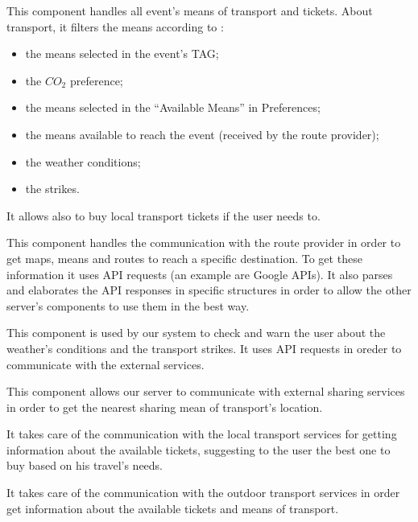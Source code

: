 This component handles all event’s means of transport and tickets. About transport, it filters the means according to :
\begin{itemize}
	\setlength{\leftskip}{1cm}
	\item the means selected in the event’s TAG;
	\item the $CO_2$ preference;
	\item the means selected in the “Available Means” in Preferences;
	\item the means available to reach the event (received by the route provider);
	\item the weather conditions;
	\item the strikes.
\end{itemize}
It allows also to buy local transport tickets if the user needs to. 

This component handles the communication with the route provider in order to get maps, means and routes to reach a specific destination. To get these information it uses API requests (an example are Google APIs).
It also parses and elaborates the API responses in specific structures in order to allow the other server’s components to use them in the best way.

This component is used by our system to check and warn the user about the weather's conditions and the transport strikes.
It uses API requests in oreder to communicate with the external services.

This component allows our server to communicate with external sharing services in order to get the nearest sharing mean of transport's location.

It takes care of the communication with the local transport services for getting information about the available tickets, suggesting to the user the best one to buy based on his travel's needs.

It takes care of the communication with the outdoor transport services in order get information about the available tickets and means of transport.

